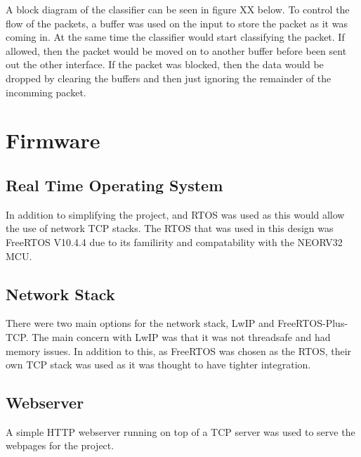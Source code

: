 A block diagram of the classifier can be seen in figure XX below. To control the flow of the packets, a buffer was used on the input to store the packet as it was coming in. At the same time the classifier would start classifying the packet. If allowed, then the packet would be moved on to another buffer before been sent out the other interface. If the packet was blocked, then the data would be dropped by clearing the buffers and then just ignoring the remainder of the incomming packet. 





\section{Firmware}

\subsection{Real Time Operating System}
In addition to simplifying the project, and RTOS was used as this would allow the use of network TCP stacks. The RTOS that was used in this design was FreeRTOS V10.4.4 due to its familirity and compatability with the NEORV32 MCU.


\subsection{Network Stack}
There were two main options for the network stack, LwIP and FreeRTOS-Plus-TCP. The main concern with LwIP was that it was not threadsafe and had memory issues. In addition to this, as FreeRTOS was chosen as the RTOS, their own TCP stack was used as it was thought to have tighter integration. 


\subsection{Webserver}
A simple HTTP webserver running on top of a TCP server was used to serve the webpages for the project. 
